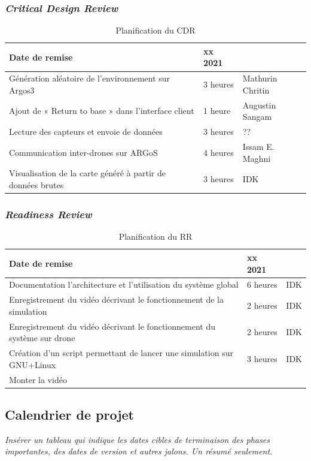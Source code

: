 \documentclass{mistcoursedoc}
\begin{document}
\subsubsection{\emph{Critical Design Review}}

\begin{table}[h!]
  \centering
  \begin{tabular}{ M{7cm}M{3cm}M{3.5cm} }\hline
    Date de remise & xx 2021 & \tabularnewline\hline
    Génération aléatoire de l’environnement sur Argos3 & 3 heures & Mathurin Chritin \tabularnewline
    Ajout de « Return to base » dans l’interface client & 1 heure & Augustin Sangam \tabularnewline
    Lecture des capteurs et envoie de données & 3 heures & ?? \tabularnewline
    Communication inter-drones sur ARGoS & 4 heures & Issam E. Maghni \tabularnewline
    Visualisation de la carte généré à partir de données brutes & 3 heures & IDK \tabularnewline\hline
  \end{tabular}
  \caption{Planification du CDR}
\end{table}

\newpage\subsubsection{\emph{Readiness Review}}

\begin{table}[h!]
  \centering
  \begin{tabular}{ M{7cm}M{3cm}M{3.5cm} }\hline
    Date de remise & xx 2021 & \tabularnewline\hline
    
    Documentation l’architecture et l’utilisation du système global & 6 heures & IDK \tabularnewline
    Enregistrement du vidéo décrivant le fonctionnement de la simulation & 2 heures & IDK \tabularnewline
    Enregistrement du vidéo décrivant le fonctionnement du système sur drone & 2 heures & IDK \tabularnewline
    Création d’un script permettant de lancer une simulation sur GNU+Linux & 3 heures & IDK \tabularnewline
    Monter la vidéo & & \tabularnewline\hline
  \end{tabular}
  \caption{Planification du RR}
\end{table}

\subsection{Calendrier de projet}\label{calendrier}

\textit{Insérer un tableau qui indique les dates cibles de terminaison des phases importantes, des dates de version et autres jalons.  Un résumé seulement.}
\end{document}

